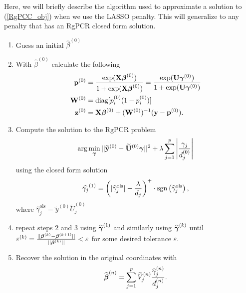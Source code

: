 \documentclass[main.tex]{subfiles}
\begin{document}
Here, we will briefly describe the algorithm used to approximate a solution to (\ref{RgPCC_obj}) when we use the LASSO penalty. This will generalize to any penalty that has an RgPCR closed form solution.

\begin{enumerate}[(Step 1)]
	\item Guess an initial $\hat{\beta}^{(0)}$
	\item With $\hat{\beta}^{(0)}$ calculate the following
		\begin{align*}
			\mathbf{p}^{(0)} &= \dfrac{\text{exp}(\mathbf{X} \boldsymbol \beta^{(0)})}{1 + \text{exp}(\mathbf{X} \boldsymbol \beta^{(0)})} = \dfrac{\text{exp}(\mathbf{U} \boldsymbol \gamma^{(0)})}{1 + \text{exp}(\mathbf{U} \boldsymbol \gamma^{(0)})}\\
			\mathbf{W}^{(0)} &= \text{diag}[p_i^{(0)}(1-p_i^{(0)})] \\
			\mathbf{z}^{(0)} &= \mathbf{X} \boldsymbol \beta^{(0)} + (\mathbf{W}^{(0)})^{-1}(\mathbf{y} - \mathbf{p}^{(0)}).
		\end{align*}
	\item Compute the solution to the RgPCR problem
	\begin{align}
		\text{arg} \min_{\boldsymbol \gamma} ||\widetilde{\mathbf{y}}^{(0)} - \widetilde{\mathbf{U}}^{(0)} \boldsymbol \gamma ||^2 + \lambda \sum_{j = 1}^p  \left | \frac{\gamma_j}{d_j^{(0)}} \right |
	\end{align}
	using the closed form solution
	\begin{align}
		\widehat{\gamma_j}^{(1)} = \left ( |\widehat{\gamma}^{\text{ols}}_j| - \frac{\lambda}{d_j} \right )^+ \cdot \text{sgn} \left ( \widehat{\gamma}^{\text{ols}}_j \right ),
	\end{align}
	where $\hat{\gamma}^{\text{ols}}_j = \tilde{y}^{(0)} \tilde{U}^{(0)}_j$
	\item repeat steps 2 and 3 using $\widehat{\boldsymbol \gamma}^{(1)}$ and similarly using $\widehat{\boldsymbol \gamma}^{(k)}$ until $\varepsilon^{(k)} = \frac{|| \boldsymbol \beta^{(k)} - \boldsymbol \beta^{(k+1)}||}{||\boldsymbol \beta^{(k)}||} < \varepsilon$ for some desired tolerance $\varepsilon$.
	\item Recover the solution in the original coordinates with $$\widehat{\boldsymbol \beta}^{(n)} = \sum_{j = 1}^p \widetilde{V}^{(n)}_j \frac{\widehat{\gamma}_j^{(n)}}{d_j^{(n)}}.$$
\end{enumerate}

\end{document}
